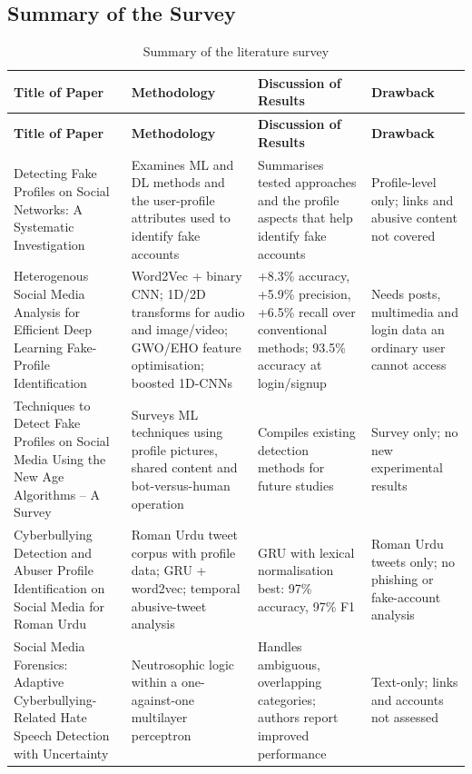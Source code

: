 \subsection{Summary of the Survey}
\begin{footnotesize}
\renewcommand{\arraystretch}{1.2}
\begin{longtable}{|>{\raggedright\arraybackslash}p{3.2cm}|>{\raggedright\arraybackslash}p{3.7cm}|>{\raggedright\arraybackslash}p{3.7cm}|>{\raggedright\arraybackslash}p{3.2cm}|}
\caption{Summary of the literature survey}\label{tab:lit}\\
\hline
\textbf{Title of Paper} & \textbf{Methodology} & \textbf{Discussion of Results} & \textbf{Drawback} \\ \hline
\endfirsthead
\hline
\textbf{Title of Paper} & \textbf{Methodology} & \textbf{Discussion of Results} & \textbf{Drawback} \\ \hline
\endhead
[1] Detecting Fake Profiles on Social Networks: A Systematic Investigation & Examines ML and DL methods and the user-profile attributes used to identify fake accounts & Summarises tested approaches and the profile aspects that help identify fake accounts & Profile-level only; links and abusive content not covered \\ \hline
[2] Heterogenous Social Media Analysis for Efficient Deep Learning Fake-Profile Identification & Word2Vec + binary CNN; 1D/2D transforms for audio and image/video; GWO/EHO feature optimisation; boosted 1D-CNNs & +8.3\% accuracy, +5.9\% precision, +6.5\% recall over conventional methods; 93.5\% accuracy at login/signup & Needs posts, multimedia and login data an ordinary user cannot access \\ \hline
[3] Techniques to Detect Fake Profiles on Social Media Using the New Age Algorithms -- A Survey & Surveys ML techniques using profile pictures, shared content and bot-versus-human operation & Compiles existing detection methods for future studies & Survey only; no new experimental results \\ \hline
[4] Cyberbullying Detection and Abuser Profile Identification on Social Media for Roman Urdu & Roman Urdu tweet corpus with profile data; GRU + word2vec; temporal abusive-tweet analysis & GRU with lexical normalisation best: 97\% accuracy, 97\% F1 & Roman Urdu tweets only; no phishing or fake-account analysis \\ \hline
[5] Social Media Forensics: Adaptive Cyberbullying-Related Hate Speech Detection with Uncertainty & Neutrosophic logic within a one-against-one multilayer perceptron & Handles ambiguous, overlapping categories; authors report improved performance & Text-only; links and accounts not assessed \\ \hline

\end{longtable}
\end{footnotesize}
